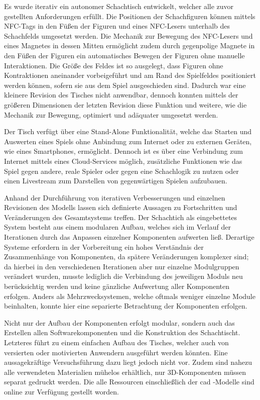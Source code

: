 Es wurde iterativ ein autonomer Schachtisch entwickelt, welcher alle
zuvor gestellten Anforderungen erfüllt. Die Positionen der Schachfiguren
können mittels NFC-Tags in den Füßen der Figuren und eines NFC-Lesers
unterhalb des Schachfelds umgesetzt werden. Die Mechanik zur Bewegung
des NFC-Lesers und eines Magnetes in dessen Mitten ermöglicht zudem
durch gegenpolige Magnete in den Füßen der Figuren ein automatisches
Bewegen der Figuren ohne manuelle Interaktionen. Die Größe des Feldes
ist so ausgelegt, dass Figuren ohne Kontraktionen aneinander
vorbeigeführt und am Rand des Spielfeldes positioniert werden können,
sofern sie aus dem Spiel ausgeschieden sind. Dadurch war eine kleinere
Revision des Tisches nicht anwendbar, dennoch konnten mittels der
größeren Dimensionen der letzten Revision diese Funktion und weitere,
wie die Mechanik zur Bewegung, optimiert und adäquater umgesetzt werden.

Der Tisch verfügt über eine Stand-Alone Funktionalität, welche das
Starten und Auswerten eines Spiels ohne Anbindung zum Internet oder zu
externen Geräten, wie eines Smartphones, ermöglicht. Dennoch ist es über
eine Verbindung zum Internet mittels eines Cloud-Services möglich,
zusätzliche Funktionen wie das Spiel gegen andere, reale Spieler oder
gegen eine Schachlogik zu nutzen oder einen Livestream zum Darstellen
von gegenwärtigen Spielen aufzubauen.

Anhand der Durchführung von iterativen Verbesserungen und einzelnen
Revisionen des Modells lassen sich definierte Aussagen zu Fortschritten
und Veränderungen des Gesamtsystems treffen. Der Schachtich als
eingebettetes System besteht aus einem modularen Aufbau, welches sich im
Verlauf der Iterationen durch das Anpassen einzelner Komponenten
aufwerten ließ. Derartige Systeme erfordern in der Vorbereitung ein
hohes Verständnis der Zusammenhänge von Komponenten, da spätere
Veränderungen komplexer sind; da hierbei in den verschiedenen
Iterationen aber nur einzelne Modulgruppen verändert wurden, musste
lediglich die Verbindung des jeweiligen Moduls neu berücksichtig werden
und keine gänzliche Aufwertung aller Komponenten erfolgen. Anders als
Mehrzwecksystemen, welche oftmals weniger einzelne Module beinhalten,
konnte hier eine separierte Betrachtung der Komponenten erfolgen.

Nicht nur der Aufbau der Komponenten erfolgt modular, sondern auch das
Erstellen allen Softwarekomponenten und die Konstruktion des
Schachtischt. Letzteres führt zu einem einfachen Aufbau des Tisches,
welcher auch von versierten oder motivierten Anwendern ausgeführt werden
könnten. Eine aussagekräftige Versuchsführung dazu liegt jedoch nicht
vor. Zudem sind nahezu alle verwendeten Materialien mühelos erhältlich,
nur 3D-Komponenten müssen separat gedruckt werden. Die alle Ressourcen
einschließlich der \gls{cad} -Modelle sind online zur Verfügung gestellt
worden.

